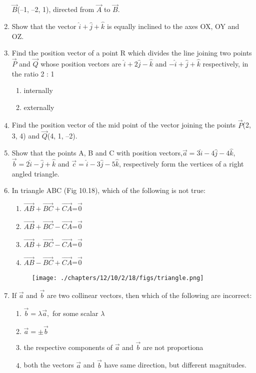 \begin{enumerate}[label=\thesection.\arabic*,ref=\thesection.\theenumi]
$\vec{B}$(–1, –2, 1), directed from $\vec{A}$ to $\vec{B}$.
\item Show that the vector $\hat{i}+\hat{j}+\hat{k}$ is equally inclined to the axes OX, OY and OZ.
\item Find the position vector of a point R which divides the line joining two points $\vec{P}$
and $\vec{Q}$ whose position vectors are $\hat{i}+2\hat{j}-\hat{k}$ and $-\hat{i}+\hat{j}+\hat{k}$ respectively, in the
ratio 2 : 1
\begin{enumerate}
    \item  internally
    \item  externally
\end{enumerate}
\solution
		
\item Find the position vector of the mid point of the vector joining the points $\vec{P}$(2, 3, 4)
and $\vec{Q}$(4, 1, –2).
\\
\solution
		
\item Show that the points A, B and C with position vectors,$\vec{a}=3\hat{i}-4\hat{j}-4\hat{k}$,$\vec{b}=2\hat{i}-\hat{j}+\hat{k}$ and $\vec{c}=\hat{i}-3\hat{j}-5\hat{k}$, respectively form the vertices of a right angled
triangle.
\\
\solution
		
\item 

	In triangle ABC (Fig 10.18), which of the following is not true:
 \begin{enumerate}
         \item $\overrightarrow{AB}+\overrightarrow{BC}+\overrightarrow{CA}$=$\vec{0}$
         \item $\overrightarrow{AB}+\overrightarrow{BC}-\overrightarrow{CA}$=$\vec{0}$
         \item $\overrightarrow{AB}+\overrightarrow{BC}-\overrightarrow{CA}$=$\vec{0}$
         \item $\overrightarrow{AB}-\overrightarrow{BC}+\overrightarrow{CA}$=$\vec{0}$
\end{enumerate}
\begin{figure}[h]
\centering
\texttt{[image: ./chapters/12/10/2/18/figs/triangle.png]}
\caption{}
	\label{fig:chapters/12/10/2/18/}
\end{figure}
\solution
		

\item If $\vec{a}$ and $\vec{b}$ are two collinear vectors, then which of the following are incorrect:
\begin{enumerate}
    \item $\vec{b}=\lambda\vec{a},$
 for some scalar $\lambda$
    \item $\vec{a}=\pm\vec{b}$
    \item the respective components of $\vec{a}$ and $\vec{b}$ are not proportiona
    \item both the vectors $\vec{a}$ and $\vec{b}$ have same direction, but different magnitudes.
\end{enumerate}
\end{enumerate}
